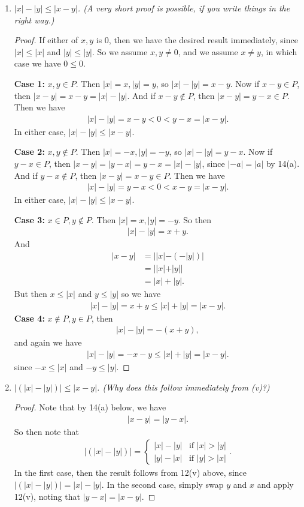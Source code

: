 \documentclass[12pt]{amsbook}
\theoremstyle{plain}
\numberwithin{section}{chapter}
\numberwithin{equation}{chapter}
\theoremstyle{definition}
\theoremstyle{remark}
\theoremstyle{plain}
\newcommand{\bb}{\vspace{3mm}}
\newcommand{\bee}{\begin{equation}\begin{aligned}}
\newcommand{\eee}{\end{aligned}\end{equation}}
\renewcommand{\leq}{\leqslant}
\begin{document}
\begin{enumerate}[label=\roman*)]
\begin{enumerate}[label=(\roman*)]
\begin{proof}
Note this proof assumes that $|y| = |-y|$, but this is proved below in 14(a). 
\end{proof}

\bb
\item \textit{$|x| - |y| \leq |x - y|$. (A very short proof is possible, if you write things in the right way.)}
\begin{proof}
If either of $x,y$ is $0$, then we have the desired result immediately, since $|x| \leq |x|$ and $|y| \leq |y|$. So we assume $x,y \neq 0$, and we assume $x \neq y$, in which case we have $0\leq 0$. 


\textbf{Case 1:} $x,y \in P$. Then $|x| = x,|y| = y$, so $|x| - |y| = x - y$. Now if $x - y \in P$, then $|x - y| = x - y = |x| - |y|$. And if $x - y \notin P$, then $|x - y| = y - x \in P$. Then we have 
\bee
|x| - |y| = x - y < 0 < y - x = |x - y|.
\eee
In either case, $|x| - |y| \leq |x - y|$. 

\textbf{Case 2:} $x,y \notin P$. Then $|x| = -x,|y| = -y$, so $|x| - |y| = y - x$. Now if $y - x \in P$, then $|x - y| = |y - x|= y - x = |x| - |y|$, since $|-a| = |a|$ by 14(a). And if $y - x \notin P$, then $|x - y| = x - y \in P$. Then we have 
\bee
|x| - |y| = y - x < 0 < x - y = |x - y|.
\eee
In either case, $|x| - |y| \leq |x - y|$. 

\textbf{Case 3:} $x \in P,y \notin P$. Then $|x| = x,|y| = -y$. So then 
\bee
|x| - |y| = x + y.
\eee
And 
\bee
|x - y| &= ||x| -(-|y|)|\\
 &= ||x| + |y|| \\
 &= |x| + |y|.
\eee
But then $x \leq |x|$ and $y \leq |y|$ so we have
\bee
|x| - |y| = x + y \leq |x| + |y| = |x - y|. 
\eee
\textbf{Case 4:} $x \notin P,y \in P$, then 
\bee
|x| - |y| = -(x + y),
\eee
and again we have
\bee
|x| - |y| = -x - y \leq |x| + |y| = |x - y|. 
\eee
since $-x \leq |x|$ and $-y \leq |y|$. 
\end{proof}

\bb
\item \textit{$|(|x| - |y|)| \leq |x - y|$. (Why does this follow immediately from (v)?)}
\begin{proof}
Note that by 14(a) below, we have
\bee
|x - y| = |y - x|.
\eee
So then note that 
\bee
|(|x| - |y|)| = \begin{cases}
|x| - |y| & \text{if }|x| > |y|\\
|y| - |x| & \text{if }|y| > |x|
\end{cases}.
\eee
In the first case, then the result follows from 12(v) above, since $|(|x| - |y|)| = |x| - |y|$. In the second case, simply swap $y$ and $x$ and apply 12(v), noting that $|y - x| = |x - y|$. 
\end{proof}
\end{enumerate}
\setcounter{enumi}{13}


\end{enumerate}
\end{document}
